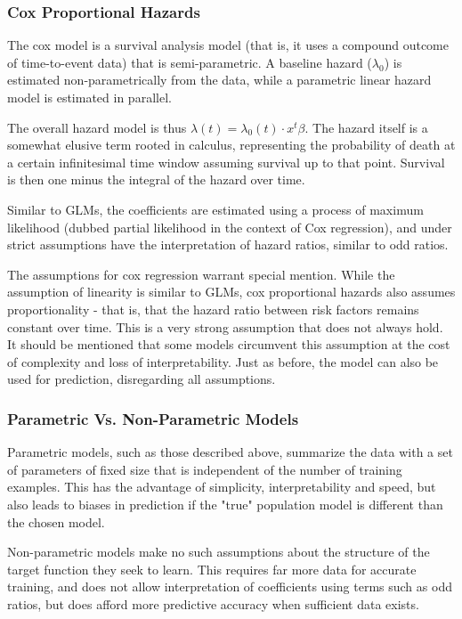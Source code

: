 \documentclass[a4paper,12pt]{article}
\begin{document}
			\subsubsection{Cox Proportional Hazards}
			
			The cox model is a survival analysis model (that is, it uses a compound outcome of time-to-event data) that is semi-parametric. A baseline hazard ($ \lambda_0 $) is estimated non-parametrically from the data, while a parametric linear hazard model is estimated in parallel\cite{Cox1972}.
			
			The overall hazard model is thus $ \lambda(t) = \lambda_0(t) \cdot x^t \beta $. The hazard itself is a somewhat elusive term rooted in calculus, representing the probability of death at a certain infinitesimal time window assuming survival up to that point. Survival is then one minus the integral of the hazard over time.
			
			Similar to GLMs, the coefficients are estimated using a process of maximum likelihood (dubbed partial likelihood in the context of Cox regression), and under strict assumptions have the interpretation of hazard ratios, similar to odd ratios.
			
			The assumptions for cox regression warrant special mention. While the assumption of linearity is similar to GLMs, cox proportional hazards also assumes proportionality - that is, that the hazard ratio between risk factors remains constant over time. This is a very strong assumption that does not always hold. It should be mentioned that some models circumvent this assumption at the cost of complexity and loss of interpretability. Just as before, the model can also be used for prediction, disregarding all assumptions.
			
			\subsubsection{Parametric Vs. Non-Parametric Models}
			Parametric models, such as those described above, summarize the data with a set of parameters of fixed size that is independent of the number of training examples. This has the advantage of simplicity, interpretability and speed, but also leads to biases in prediction if the "true" population model is different than the chosen model.
			
			Non-parametric models make no such assumptions about the structure of the target function they seek to learn. This requires far more data for accurate training, and does not allow interpretation of coefficients using terms such as odd ratios, but does afford more predictive accuracy when sufficient data exists\cite{Russell2002}.
			
\end{document}
